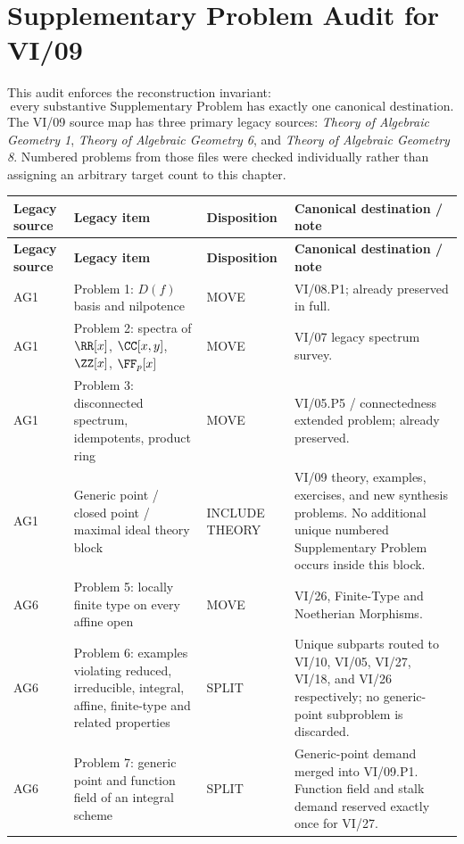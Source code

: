 \chapter*{Supplementary Problem Audit for VI/09}

\noindent
This audit enforces the reconstruction invariant:
\[
\boxed{\text{every substantive Supplementary Problem has exactly one canonical destination}.}
\]
The VI/09 source map has three primary legacy sources:
\emph{Theory of Algebraic Geometry 1}, \emph{Theory of Algebraic Geometry 6}, and
\emph{Theory of Algebraic Geometry 8}.  Numbered problems from those files were checked
individually rather than assigning an arbitrary target count to this chapter.

\begin{longtable}{p{}p{}p{}p{}}
\toprule
\textbf{Legacy source} & \textbf{Legacy item} & \textbf{Disposition} & \textbf{Canonical destination / note}\\
\midrule
\endfirsthead
\toprule
\textbf{Legacy source} & \textbf{Legacy item} & \textbf{Disposition} & \textbf{Canonical destination / note}\\
\midrule
\endhead
AG1 & Problem 1: $D(f)$ basis and nilpotence & MOVE & VI/08.P1; already preserved in full.\\
AG1 & Problem 2: spectra of $\RR[x]$, $\CC[x,y]$, $\ZZ[x]$, $\FF_p[x]$ & MOVE & VI/07 legacy spectrum survey.\\
AG1 & Problem 3: disconnected spectrum, idempotents, product ring & MOVE & VI/05.P5 / connectedness extended problem; already preserved.\\
AG1 & Generic point / closed point / maximal ideal theory block & INCLUDE THEORY & VI/09 theory, examples, exercises, and new synthesis problems.  No additional unique numbered Supplementary Problem occurs inside this block.\\
\midrule
AG6 & Problem 5: locally finite type on every affine open & MOVE & VI/26, Finite-Type and Noetherian Morphisms.\\
AG6 & Problem 6: examples violating reduced, irreducible, integral, affine, finite-type and related properties & SPLIT & Unique subparts routed to VI/10, VI/05, VI/27, VI/18, and VI/26 respectively; no generic-point subproblem is discarded.\\
AG6 & Problem 7: generic point and function field of an integral scheme & SPLIT & Generic-point demand merged into VI/09.P1.  Function field and stalk demand reserved exactly once for VI/27.\\

\end{longtable}
